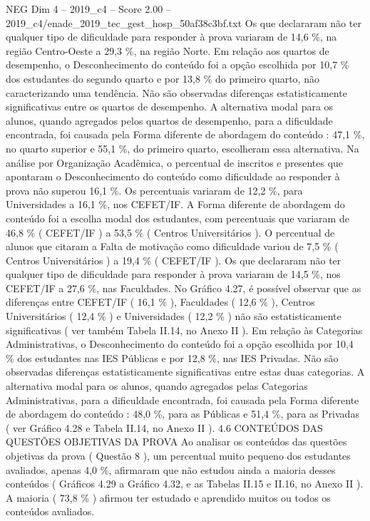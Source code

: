 \begin{textsample}{NEG Dim 4 – 2019\_c4 – Score 2.00 – 2019\_c4/enade\_2019\_tec\_gest\_hosp\_50af38c3bf.txt}
Os que declararam não ter qualquer tipo de dificuldade para responder à prova variaram de 14,6 \%, na região Centro-Oeste a 29,3 \%, na região Norte.
Em relação aos quartos de desempenho, o Desconhecimento do conteúdo foi a opção escolhida por 10,7 \% dos estudantes do segundo quarto e por 13,8 \% do primeiro quarto, não caracterizando uma tendência.
Não são observadas diferenças estatisticamente significativas entre os quartos de desempenho.
A alternativa modal para os alunos, quando agregados pelos quartos de desempenho, para a dificuldade encontrada, foi causada pela Forma diferente de abordagem do conteúdo : 47,1 \%, no quarto superior e 55,1 \%, do primeiro quarto, escolheram essa alternativa.
Na análise por Organização Acadêmica, o percentual de inscritos e presentes que apontaram o Desconhecimento do conteúdo como dificuldade ao responder à prova não superou 16,1 \%.
Os percentuais variaram de 12,2 \%, para Universidades a 16,1 \%, nos CEFET/IF.
A Forma diferente de abordagem do conteúdo foi a escolha modal dos estudantes, com percentuais que variaram de 46,8 \% ( CEFET/IF ) a 53,5 \% ( Centros Universitários ).
O percentual de alunos que citaram a Falta de motivação como dificuldade variou de 7,5 \% ( Centros Universitários ) a 19,4 \% ( CEFET/IF ).
Os que declararam não ter qualquer tipo de dificuldade para responder à prova variaram de 14,5 \%, nos CEFET/IF a 27,6 \%, nas Faculdades.
No Gráfico 4.27, é possível observar que as diferenças entre CEFET/IF ( 16,1 \% ), Faculdades ( 12,6 \% ), Centros Universitários ( 12,4 \% ) e Universidades ( 12,2 \% ) não são estatisticamente significativas ( ver também Tabela II.14, no Anexo II ).
Em relação às Categorias Administrativas, o Desconhecimento do conteúdo foi a opção escolhida por 10,4 \% dos estudantes nas IES Públicas e por 12,8 \%, nas IES Privadas.
Não são observadas diferenças estatisticamente significativas entre estas duas categorias.
A alternativa modal para os alunos, quando agregados pelas Categorias Administrativas, para a dificuldade encontrada, foi causada pela Forma diferente de abordagem do conteúdo : 48,0 \%, para as Públicas e 51,4 \%, para as Privadas ( ver Gráfico 4.28 e Tabela II.14, no Anexo II ). 4.6 CONTEÚDOS DAS QUESTÕES OBJETIVAS DA PROVA Ao analisar os conteúdos das questões objetivas da prova ( Questão 8 ), um percentual muito pequeno dos estudantes avaliados, apenas 4,0 \%, afirmaram que não estudou ainda a maioria desses conteúdos ( Gráficos 4.29 a Gráfico 4.32, e as Tabelas II.15 e II.16, no Anexo II ).
A maioria ( 73,8 \% ) afirmou ter estudado e aprendido muitos ou todos os conteúdos avaliados.

\end{textsample}
